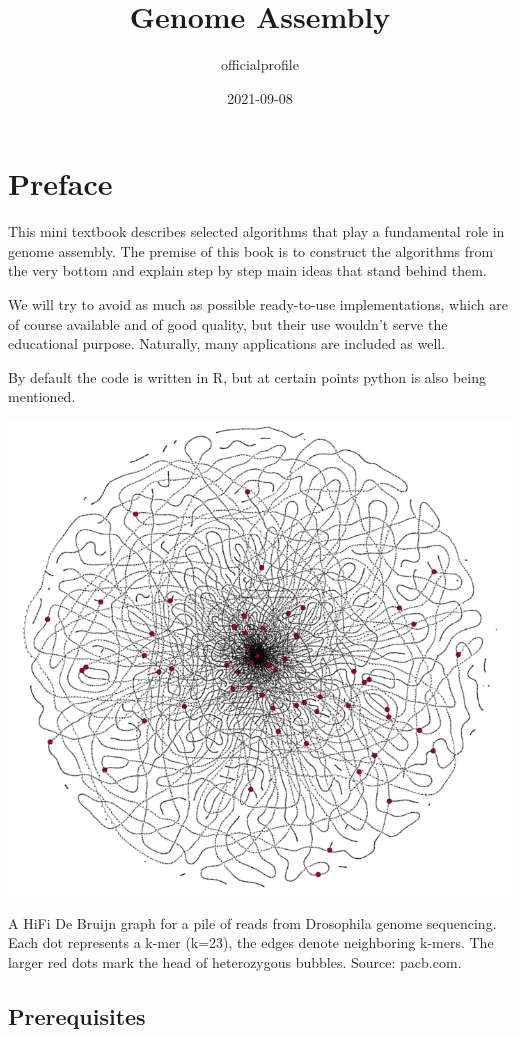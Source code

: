 \documentclass[
]{book}
\title{Genome Assembly}
\author{officialprofile}
\date{2021-09-08}
\begin{document}
\maketitle

{
\setcounter{tocdepth}{1}
\tableofcontents
}
\hypertarget{preface}{%
\chapter{Preface}\label{preface}}

This mini textbook describes selected algorithms that play a fundamental role in genome assembly. The premise of this book is to construct the algorithms from the very bottom and explain step by step main ideas that stand behind them.

We will try to avoid as much as possible ready-to-use implementations, which are of course available and of good quality, but their use wouldn't serve the educational purpose. Naturally, many applications are included as well.

By default the code is written in R, but at certain points python is also being mentioned.

\begin{center}\includegraphics[width=0.8\linewidth]{img/cover} \end{center}

A HiFi De Bruijn graph for a pile of reads from Drosophila genome sequencing. Each dot represents a k-mer (k=23), the edges denote neighboring k-mers. The larger red dots mark the head of heterozygous bubbles. Source: pacb.com.

\hypertarget{prerequisites}{%
\section{Prerequisites}\label{prerequisites}}
\end{document}
